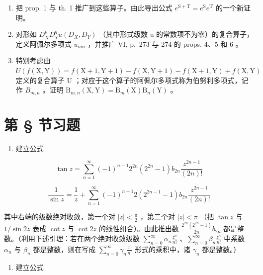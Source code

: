 \begin{enumerate}
\def\labelenumi{\alph{enumi})}
\item
  把 prop. 1 与 th. 1 推广到这些算子。由此导出公式 \(e^{\mathrm{S + T}} = e^{\mathrm{S}}e^{\mathrm{T}}\) 的一个新证明。
\item
  对形如 \(D_{X}^{p}D_{Y}^{q}u(D_{X},D_{Y})\) （其中形式级数 u 的常数项不为零）的复合算子，定义阿佩尔多项式 \(u_{mn}\) ，并推广 VI, p.~273 与 274 的 props. 4、5 和 6 。
\item
  特别考虑由 \(U(f(\mathrm{X},\mathrm{Y})) = f(\mathrm{X} + 1, \mathrm{Y} + 1) - f(\mathrm{X},\mathrm{Y} + 1) - f(\mathrm{X} + 1, \mathrm{Y}) + f(\mathrm{X},\mathrm{Y})\) 定义的复合算子 U ；对应于这个算子的阿佩尔多项式称为伯努利多项式，记作 \(B_{m,n}\) 。证明 \(\mathrm{B}_{m,n}(\mathrm{X},\mathrm{Y}) = \mathrm{B}_{m}(\mathrm{X})\mathrm{B}_{n}(\mathrm{Y})\) 。
\end{enumerate}

\setcounter{exercisegroup}{1}
\section*{第 \S{} 节习题}
{}

\begin{enumerate}
\def\labelenumi{\arabic{enumi})}
\tightlist
\item
  建立公式
\end{enumerate}

\[
\tan z = \sum_ {n = 1} ^ {\infty} (- 1) ^ {n - 1} 2 ^ {2 n} (2 ^ {2 n} - 1) b _ {2 n} \frac {z ^ {2 n - 1}}{(2 n) !}
\]

\[
\frac {1}{\sin z} = \frac {1}{z} + \sum_ {n = 1} ^ {\infty} (- 1) ^ {n - 1} 2 (2 ^ {2 n - 1} - 1) b _ {2 n} \frac {z ^ {2 n - 1}}{(2 n) !}
\]

其中右端的级数绝对收敛，第一个对 \(|z| < \frac{\pi}{2}\) ，第二个对 \(|z| < \pi\) （把 \(\tan z\) 与 \(1/\sin 2z\) 表成 \(\cot z\) 与 \(\cot 2z\) 的线性组合）。由此推出数 \(\frac{2^{2n}(2^{2n}-1)}{2n} b_{2n}\) 都是整数。（利用下述引理：若在两个绝对收敛级数 \(\sum_{n=0}^{\infty} \alpha_n \frac{z^n}{n!}\) 、\(\sum_{n=0}^{\infty} \beta_n \frac{z^n}{n!}\) 中系数 \(\alpha_n\) 与 \(\beta_n\) 都是整数，则在写成 \(\sum_{n=0}^{\infty} \gamma_n \frac{z^n}{n!}\) 形式的乘积中，诸 \(\gamma_n\) 都是整数。）

\begin{enumerate}
\def\labelenumi{\arabic{enumi})}
\setcounter{enumi}{1}
\tightlist
\item
  建立公式
\end{enumerate}

